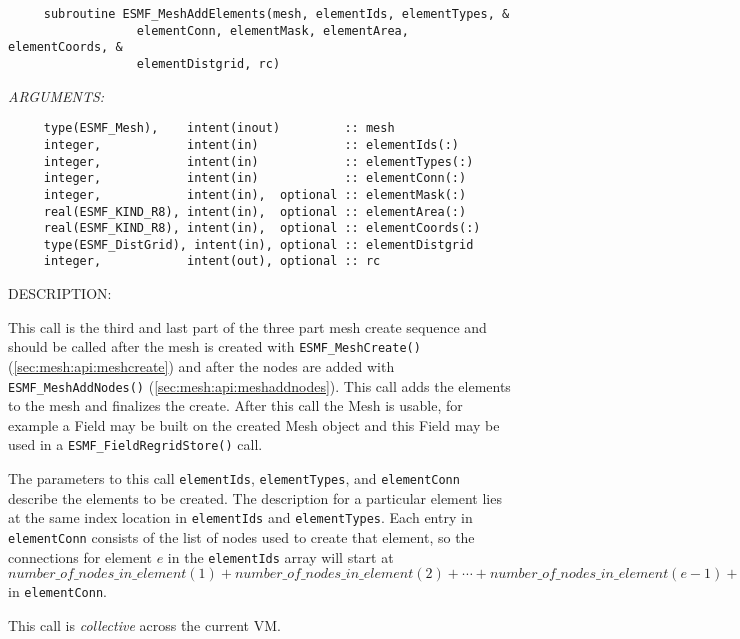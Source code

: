   
\begin{verbatim}     subroutine ESMF_MeshAddElements(mesh, elementIds, elementTypes, &
                  elementConn, elementMask, elementArea, elementCoords, &
                  elementDistgrid, rc)\end{verbatim}{\em ARGUMENTS:}
\begin{verbatim}     type(ESMF_Mesh),    intent(inout)         :: mesh
     integer,            intent(in)            :: elementIds(:)
     integer,            intent(in)            :: elementTypes(:)
     integer,            intent(in)            :: elementConn(:)
     integer,            intent(in),  optional :: elementMask(:)
     real(ESMF_KIND_R8), intent(in),  optional :: elementArea(:)
     real(ESMF_KIND_R8), intent(in),  optional :: elementCoords(:)
     type(ESMF_DistGrid), intent(in), optional :: elementDistgrid
     integer,            intent(out), optional :: rc\end{verbatim}
{\sf DESCRIPTION:\\ }


     This call is the third and last part of the three part mesh create
     sequence and should be called after the mesh is created with {\tt ESMF\_MeshCreate()}
     (\ref{sec:mesh:api:meshcreate})
     and after the nodes are added with {\tt ESMF\_MeshAddNodes()} (\ref{sec:mesh:api:meshaddnodes}).
     This call adds the elements to the
     mesh and finalizes the create. After this call the Mesh is usable, for
     example a Field may be built on the created Mesh object and
     this Field may be used in a {\tt ESMF\_FieldRegridStore()} call.
  
     The parameters to this call {\tt elementIds}, {\tt elementTypes}, and
     {\tt elementConn} describe the elements to be created. The description
     for a particular element lies at the same index location in {\tt elementIds}
     and {\tt elementTypes}. Each entry in {\tt elementConn} consists of the list of
     nodes used to create that element, so the connections for element $e$ in the
     {\tt elementIds} array will start at $number\_of\_nodes\_in\_element(1) + number\_of\_nodes\_in\_element(2) +
     \cdots + number\_of\_nodes\_in\_element(e-1) + 1$ in {\tt elementConn}.
  
     This call is {\em collective} across the current VM.
  
